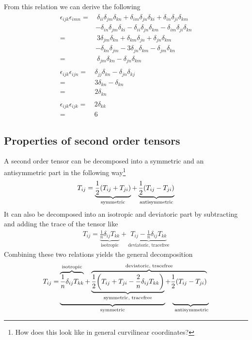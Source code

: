 From this relation we can derive the following
\begin{align}
\begin{split}
\epsilon_{ijk}\epsilon_{imn}
=&\ \delta_{ii}\delta_{jm}\delta_{kn}
+\delta_{im}\delta_{jn}\delta_{ki}
+\delta_{in}\delta_{ji}\delta_{km}\\
&-\delta_{in}\delta_{jm}\delta_{ki}
-\delta_{ii}\delta_{jn}\delta_{km}
-\delta_{im}\delta_{ji}\delta_{kn}\\
=&\ 3\delta_{jm}\delta_{kn}
+\delta_{km}\delta_{jn}
+\delta_{jn}\delta_{km}\\
&-\delta_{kn}\delta_{jm}
-3\delta_{jn}\delta_{km}
-\delta_{jm}\delta_{kn}\\
=&\ \delta_{jm}\delta_{kn}-\delta_{jn}\delta_{km}
\end{split}
\\
\begin{split}
\epsilon_{ijk}\epsilon_{ijn}
=&\ \delta_{jj}\delta_{kn}-\delta_{jn}\delta_{kj}\\
=&\ 3\delta_{kn}-\delta_{kn}\\
=&\ 2\delta_{kn}
\end{split}
\\
\begin{split}
\epsilon_{ijk}\epsilon_{ijk}
=&\ 2\delta_{kk}\\
=&\ 6
\end{split}
\end{align}

\subsection{Properties of second order tensors}
A second order tensor can be decomposed into a symmetric and an antisymmetric
part in the following way\footnote{How does this look like in general
curvilinear coordinates?}
\begin{align}
T_{ij}=\underbrace{\frac{1}{2}{ \left( T_{ij}+T_{ji} \right) }}_{\text{symmetric}}
+\underbrace{\frac{1}{2}{ \left( T_{ij}-T_{ji} \right) }}_{\text{antisymmetric}}
\end{align}
It can also be decomposed into an isotropic and deviatoric part by subtracting
and adding the trace of the tensor like
\begin{align}
T_{ij}=\underbrace{\frac{1}{n}\delta_{ij} T_{kk}}_{\text{isotropic}}
+\underbrace{T_{ij}-\frac{1}{n}\delta_{ij} T_{kk}}_{\text{deviatoric, 
tracefree}}
\end{align}
Combining these two relations yields the general decomposition
\begin{align}
\begin{split}
T_{ij}=&
\overbrace{\frac{1}{n}\delta_{ij} T_{kk}}^{\text{isotropic}}
+
\overbrace{
\underbrace{\frac{1}{2}\lra{T_{ij}+T_{ji}-\frac{2}{n}\delta_{ij}
T_{kk}}}_{\text{symmetric, tracefree}}
+\frac{1}{2}\lra{T_{ij}-T_{ji}}}^{\text{deviatoric, tracefree}}\\[-1em]
&\underbrace{\hphantom{\frac{1}{n}\delta_{ij}
T_{kk}+\frac{1}{2}\lra{T_{ij}+T_{ji}-\frac{2}{n}\delta_{ij}
T_{kk}}}}_{\text{symmetric}}
\hphantom{+}
\underbrace{\hphantom{\frac{1}{2}\lra{T_{ij}-T_{ji}}}}_{\text{
antisymmetric}}
\end{split}
\end{align}

